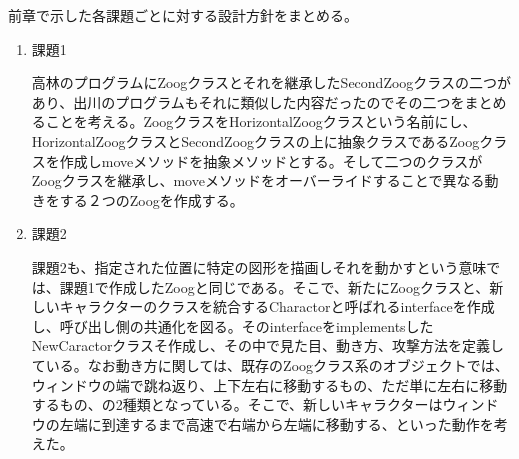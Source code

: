 \documentclass[dvipdfmx]{jsarticle}
\begin{document}
前章で示した各課題ごとに対する設計方針をまとめる。
\begin{enumerate}
\item 課題1\par
高林のプログラムにZoogクラスとそれを継承したSecondZoogクラスの二つがあり、出川のプログラムもそれに類似した内容だったのでその二つをまとめることを考える。ZoogクラスをHorizontalZoogクラスという名前にし、HorizontalZoogクラスとSecondZoogクラスの上に抽象クラスであるZoogクラスを作成しmoveメソッドを抽象メソッドとする。そして二つのクラスがZoogクラスを継承し、moveメソッドをオーバーライドすることで異なる動きをする２つのZoogを作成する。
\item 課題2\par
課題2も、指定された位置に特定の図形を描画しそれを動かすという意味では、課題1で作成したZoogと同じである。そこで、新たにZoogクラスと、新しいキャラクターのクラスを統合するCharactorと呼ばれるinterfaceを作成し、呼び出し側の共通化を図る。そのinterfaceをimplementsしたNewCaractorクラスそ作成し、その中で見た目、動き方、攻撃方法を定義している。なお動き方に関しては、既存のZoogクラス系のオブジェクトでは、ウィンドウの端で跳ね返り、上下左右に移動するもの、ただ単に左右に移動するもの、の2種類となっている。そこで、新しいキャラクターはウィンドウの左端に到達するまで高速で右端から左端に移動する、といった動作を考えた。
\end{enumerate}
\end{document}
